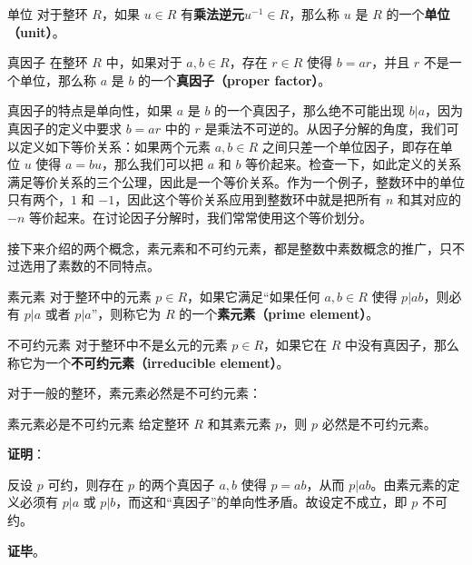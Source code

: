 \begin{definition}{单位}
对于整环 $R$，如果 $u\in R$ 有\textbf{乘法逆元}$u^{-1}\in R$，那么称 $u$ 是 $R$ 的一个\textbf{单位（unit）}。
\end{definition}

\begin{definition}{真因子}
在整环 $R$ 中，如果对于 $a, b\in R$，存在 $r\in R$ 使得 $b=ar$，并且 $r$ 不是一个单位，那么称 $a$ 是 $b$ 的一个\textbf{真因子（proper factor）}。
\end{definition}

真因子的特点是单向性，如果 $a$ 是 $b$ 的一个真因子，那么绝不可能出现 $b|a$，因为真因子的定义中要求 $b=ar$ 中的 $r$ 是乘法不可逆的。从因子分解的角度，我们可以定义如下等价关系：如果两个元素 $a, b\in R$ 之间只差一个单位因子，即存在单位 $u$ 使得 $a=bu$，那么我们可以把 $a$ 和 $b$ 等价起来。检查一下，如此定义的关系满足等价关系的三个公理，因此是一个等价关系。作为一个例子，整数环中的单位只有两个，$1$ 和 $-1$，因此这个等价关系应用到整数环中就是把所有 $n$ 和其对应的 $-n$ 等价起来。在讨论因子分解时，我们常常使用这个等价划分。

接下来介绍的两个概念，素元素和不可约元素，都是整数中素数概念的推广，只不过选用了素数的不同特点。

\begin{definition}{素元素}
对于整环中的元素 $p\in R$，如果它满足“如果任何 $a, b\in R$ 使得 $p|ab$，则必有 $p|a$ 或者 $p|a$”，则称它为 $R$ 的一个\textbf{素元素（prime element）}。
\end{definition}

\begin{definition}{不可约元素}
对于整环中不是幺元的元素 $p\in R$，如果它在 $R$ 中没有真因子，那么称它为一个\textbf{不可约元素（irreducible element）}。
\end{definition}

对于一般的整环，素元素必然是不可约元素：

\begin{theorem}{素元素必是不可约元素}
给定整环 $R$ 和其素元素 $p$，则 $p$ 必然是不可约元素。
\end{theorem}

\textbf{证明}：

反设 $p$ 可约，则存在 $p$ 的两个真因子 $a, b$ 使得 $p=ab$，从而 $p|ab$。由素元素的定义必须有 $p|a$ 或 $p|b$，而这和“真因子”的单向性矛盾。故设定不成立，即 $p$ 不可约。

\textbf{证毕}。



